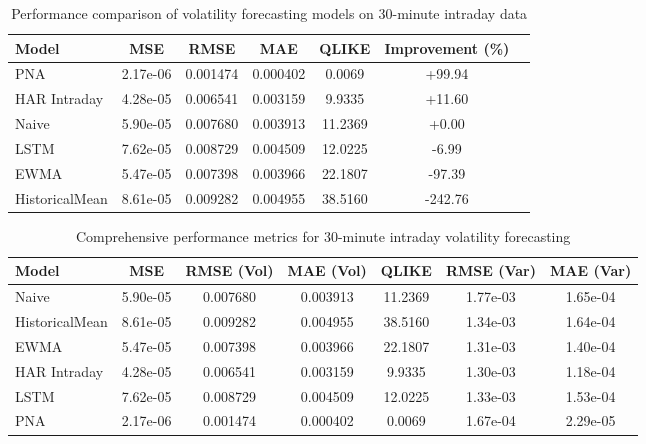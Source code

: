 \documentclass[journal]{IEEEtran}
\begin{document}
\begin{table}[!t]
\centering
\caption{Performance comparison of volatility forecasting models on 30-minute intraday data}
\label{tab:main_results}
\begin{tabular}{@{}lcccccc@{}}
\toprule
Model & MSE & RMSE & MAE & QLIKE & Improvement (\%) \\
\midrule
PNA & 2.17e-06 & 0.001474 & 0.000402 & 0.0069 & +99.94 \\
HAR Intraday & 4.28e-05 & 0.006541 & 0.003159 & 9.9335 & +11.60 \\
\rowcolor{bestcolor}Naive & 5.90e-05 & 0.007680 & 0.003913 & 11.2369 & +0.00 \\
LSTM & 7.62e-05 & 0.008729 & 0.004509 & 12.0225 & -6.99 \\
EWMA & 5.47e-05 & 0.007398 & 0.003966 & 22.1807 & -97.39 \\
HistoricalMean & 8.61e-05 & 0.009282 & 0.004955 & 38.5160 & -242.76 \\
\bottomrule
\end{tabular}
\end{table}


\begin{table*}[!t]
\centering
\caption{Comprehensive performance metrics for 30-minute intraday volatility forecasting}
\label{tab:comprehensive_results}
\begin{tabular}{@{}lS[table-format=1.2e-1]S[table-format=1.6]S[table-format=1.6]S[table-format=1.4]S[table-format=1.2e-1]S[table-format=1.2e-1]@{}}
\toprule
{Model} & {MSE} & {RMSE (Vol)} & {MAE (Vol)} & {QLIKE} & {RMSE (Var)} & {MAE (Var)} \\
\midrule
{}Naive & 5.90e-05 & 0.007680 & 0.003913 & 11.2369 & 1.77e-03 & 1.65e-04 \\
HistoricalMean & 8.61e-05 & 0.009282 & 0.004955 & 38.5160 & 1.34e-03 & 1.64e-04 \\
EWMA & 5.47e-05 & 0.007398 & 0.003966 & 22.1807 & 1.31e-03 & 1.40e-04 \\
HAR Intraday & 4.28e-05 & 0.006541 & 0.003159 & 9.9335 & 1.30e-03 & 1.18e-04 \\
LSTM & 7.62e-05 & 0.008729 & 0.004509 & 12.0225 & 1.33e-03 & 1.53e-04 \\
PNA & 2.17e-06 & 0.001474 & 0.000402 & 0.0069 & 1.67e-04 & 2.29e-05 \\
\bottomrule
\end{tabular}
\end{table*}
\end{document}
